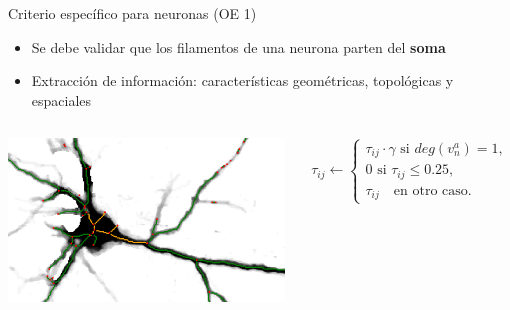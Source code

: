 \begin{frame}{Criterio espec\'ifico para neuronas (OE 1)}
    \begin{itemize}
        \item Se debe validar que los filamentos de una neurona parten del {\bf soma}
        \item  Extracci\'on de informaci\'on: caracter\'isticas geom\'etricas, topol\'ogicas y espaciales
    \end{itemize}
    \begin{columns}
        \begin{column}{0.55\textwidth}
        \centering
        \includegraphics[height=1.7in]{Pictures/Porta183-somaEdges-example2.png}
        \end{column}
        \begin{column}{0.45\textwidth}
            \begin{equation}
                \tau_{ij} \leftarrow
                    \begin{cases}
                     \tau_{ij} \cdot \gamma \text{ si } deg(v^{a}_{n}) = 1,  \\[3ex]
                    
                    \text{0 si } \tau_{ij} \leq 0.25, \\[3ex]
                    \tau_{ij} \quad \text{en otro caso}.
                    \end{cases}
            \end{equation}
        \end{column}
    \end{columns}
    
\end{frame}

